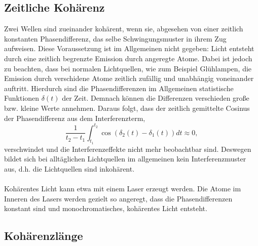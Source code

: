 \subsection{Zeitliche Kohärenz}
Zwei Wellen sind zueinander kohärent, wenn sie, abgesehen von einer zeitlich konstanten Phasendifferenz, das selbe Schwingungsmuster in ihrem Zug aufweisen.
Diese Voraussetzung ist im Allgemeinen nicht gegeben:
Licht entsteht durch eine zeitlich begrenzte Emission durch angeregte Atome.
Dabei ist jedoch zu beachten, dass bei normalen Lichtquellen, wie zum Beispiel Glühlampen, die Emission durch verschidene Atome zeitlich zufällig und unabhängig voneinander auftritt.
Hierdurch sind die Phasendifferenzen im Allgemeinen statistische Funktionen $\delta(t)$ der Zeit.
Demnach können die Differenzen verschieden große bzw. kleine Werte annehmen.
Daraus folgt, dass der zeitlich gemittelte Cosinus der Phasendifferenz aus dem Interferenzterm,
\begin{equation}
  \frac{1}{t_2-t_1} \int_{t_1}^{t_2} \cos{(\delta_2(t)-\delta_1(t))}dt \approx 0,
\end{equation}
verschwindet und die Interferenzeffekte nicht mehr beobachtbar sind.
Deswegen bildet sich bei alltäglichen Lichtquellen im allgemeinen kein Interferenzmuster aus, d.h. die Lichtquellen sind inkohärent.\\
\\
Kohärentes Licht kann etwa mit einem Laser erzeugt werden.
Die Atome im Inneren des Lasers werden gezielt so angeregt, dass die Phasendifferenzen konstant sind und monochromatisches, kohärentes Licht entsteht.

\subsection{Kohärenzlänge}

